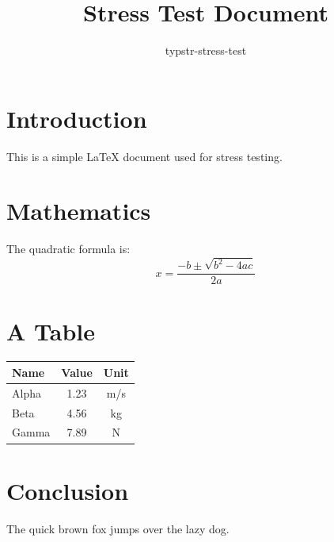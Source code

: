 \documentclass{article}
\title{Stress Test Document}
\author{typstr-stress-test}
\date{}
\begin{document}
\maketitle

\section{Introduction}
This is a simple \LaTeX{} document used for stress testing.

\section{Mathematics}
The quadratic formula is:
\begin{equation}
  x = \frac{-b \pm \sqrt{b^2 - 4ac}}{2a}
\end{equation}

\section{A Table}
\begin{tabular}{lcc}
  \hline
  Name  & Value & Unit \\
  \hline
  Alpha & 1.23  & m/s  \\
  Beta  & 4.56  & kg   \\
  Gamma & 7.89  & N    \\
  \hline
\end{tabular}

\section{Conclusion}
The quick brown fox jumps over the lazy dog.
\end{document}

